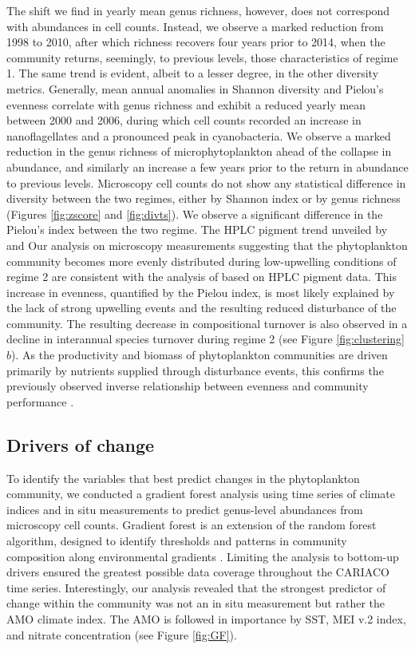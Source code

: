 \documentclass[draft]{agujournal2019}
\begin{document}
The shift we find in yearly mean genus richness, however, does not correspond with abundances in cell counts. Instead, we observe a marked reduction from 1998 to 2010, after which richness recovers four years prior to 2014, when the community returns, seemingly, to previous levels, those characteristics of regime 1. The same trend is evident, albeit to a lesser degree, in the other diversity metrics. Generally, mean annual anomalies in Shannon diversity and Pielou's evenness correlate with genus richness and exhibit a reduced yearly mean between 2000 and 2006, during which cell counts recorded an increase in nanoflagellates and a pronounced peak in cyanobacteria.
 We observe a marked reduction in the genus richness of microphytoplankton ahead of the collapse in abundance, and similarly an increase a few years prior to the return in abundance to previous levels. Microscopy cell counts do not show any statistical difference in diversity between the two  regimes, either by Shannon index or by genus richness (Figures \ref{fig:zscore} and \ref{fig:divts}).
We observe a significant difference in the Pielou's index between the two regime. The HPLC pigment trend unveiled by and Our analysis on microscopy measurements suggesting that the phytoplankton community becomes more evenly distributed during low-upwelling conditions of regime 2 are consistent with the analysis of \citeauthor{pinckney_phytoplankton_2015} based on HPLC pigment data. This increase in evenness, quantified by the Pielou index, is most likely explained by the lack of strong upwelling events and the resulting reduced disturbance of the community. The resulting decrease in compositional turnover is also observed in a decline in interannual species turnover during regime 2 (see Figure \ref{fig:clustering}$b$). As the productivity and biomass of phytoplankton communities are driven primarily by nutrients supplied through disturbance events, this confirms the previously observed inverse relationship between evenness and community performance \cite{lehtinen_phytoplankton_2017, otero_phytoplankton_2020}.



\subsection{Drivers of change}
To identify the variables that best predict changes in the phytoplankton community, we conducted a gradient forest analysis using time series of climate indices and in situ measurements to predict genus-level abundances from microscopy cell counts. Gradient forest is an extension of the random forest algorithm, designed to identify thresholds and patterns in community composition along environmental gradients \cite{ellis_gradient_2012}. Limiting the analysis to bottom-up drivers ensured the greatest possible data coverage throughout the CARIACO time series. Interestingly, our analysis revealed that the strongest predictor of change within the community was not an in situ measurement but rather the AMO climate index. The AMO is followed in importance by SST, MEI v.2 index, and nitrate concentration (see Figure \ref{fig:GF}).
\end{document}
